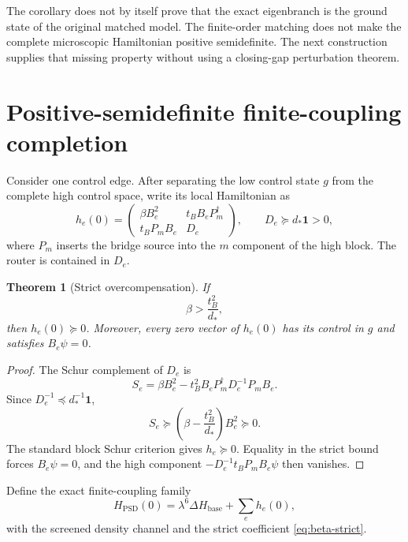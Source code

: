 \documentclass[11pt]{article}
\newtheorem{theorem}{Theorem}[section]
\theoremstyle{definition}
\theoremstyle{remark}
\newcommand{\Id}{\mathbf 1}
\begin{document}
The corollary does not by itself prove that the exact eigenbranch is the ground state of the original matched model.  The finite-order matching does not make the complete microscopic Hamiltonian positive semidefinite.  The next construction supplies that missing property without using a closing-gap perturbation theorem.

\section{Positive-semidefinite finite-coupling completion}\label{sec:psd}

Consider one control edge.  After separating the low control state $g$ from the complete high control space, write its local Hamiltonian as
\begin{equation}
 h_e(0)=
 \begin{pmatrix}
 \beta B_e^2&t_BB_eP_m^\dagger\\
 t_BP_mB_e&D_e
 \end{pmatrix},
 \qquad
 D_e\succeq d_*\Id>0,
 \label{eq:local-block}
\end{equation}
where $P_m$ inserts the bridge source into the $m$ component of the high block.  The router is contained in $D_e$.

\begin{theorem}[Strict overcompensation]
\label{thm:overcomp}
If
\begin{equation}
 \beta>\frac{t_B^2}{d_*},
 \label{eq:beta-strict}
\end{equation}
then $h_e(0)\succeq0$.  Moreover, every zero vector of $h_e(0)$ has its control in $g$ and satisfies $B_e\psi=0$.
\end{theorem}

\begin{proof}
The Schur complement of $D_e$ is
\begin{equation}
 S_e=\beta B_e^2-t_B^2B_eP_m^\dagger D_e^{-1}P_mB_e.
 \end{equation}
Since $D_e^{-1}\preceq d_*^{-1}\Id$,
\begin{equation}
 S_e\succeq\left(\beta-\frac{t_B^2}{d_*}\right)B_e^2\succeq0.
 \label{eq:Schur-bound}
\end{equation}
The standard block Schur criterion gives $h_e\succeq0$.  Equality in the strict bound forces $B_e\psi=0$, and the high component $-D_e^{-1}t_BP_mB_e\psi$ then vanishes.
\end{proof}

Define the exact finite-coupling family
\begin{equation}
 H_{\mathrm{PSD}}(0)
 =\lambda^6\Delta H_{\mathrm{base}}+\sum_e h_e(0),
 \label{eq:HPSD}
\end{equation}
with the screened density channel and the strict coefficient \eqref{eq:beta-strict}.
\end{document}
